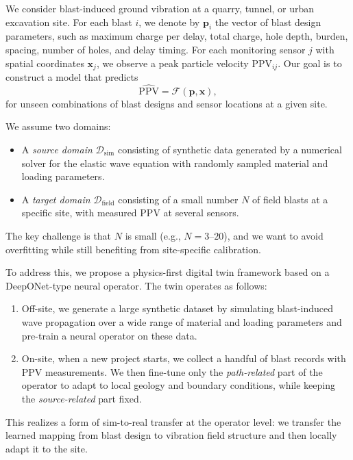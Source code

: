 \documentclass[a4paper,fleqn]{cas-sc}
\begin{document}
We consider blast-induced ground vibration at a quarry, tunnel, or urban excavation site.
For each blast $i$, we denote by $\mathbf{p}_i$ the vector of blast design parameters,
such as maximum charge per delay, total charge, hole depth,
burden, spacing, number of holes, and delay timing.
For each monitoring sensor $j$ with spatial coordinates $\mathbf{x}_j$,
we observe a peak particle velocity $\mathrm{PPV}_{ij}$.
Our goal is to construct a model that predicts
\begin{equation}
    \hat{\mathrm{PPV}} = \mathcal{F}(\mathbf{p}, \mathbf{x}),
\end{equation}
for unseen combinations of blast designs and sensor locations at a given site.

We assume two domains:
\begin{itemize}
  \item A \emph{source domain} $\mathcal{D}_\mathrm{sim}$ consisting of synthetic data generated by a numerical solver
        for the elastic wave equation with randomly sampled material and loading parameters.
  \item A \emph{target domain} $\mathcal{D}_\mathrm{field}$ consisting of a small number $N$ of field blasts at a specific site,
        with measured PPV at several sensors.
\end{itemize}
The key challenge is that $N$ is small (e.g., $N = 3$--$20$),
and we want to avoid overfitting while still benefiting from site-specific calibration.

To address this, we propose a physics-first digital twin framework
based on a DeepONet-type neural operator.
The twin operates as follows:
\begin{enumerate}
  \item Off-site, we generate a large synthetic dataset by simulating blast-induced wave propagation
        over a wide range of material and loading parameters
        and pre-train a neural operator on these data.
  \item On-site, when a new project starts,
        we collect a handful of blast records with PPV measurements.
        We then fine-tune only the \emph{path-related} part of the operator
        to adapt to local geology and boundary conditions,
        while keeping the \emph{source-related} part fixed.
\end{enumerate}
This realizes a form of sim-to-real transfer at the operator level:
we transfer the learned mapping from blast design to vibration field structure
and then locally adapt it to the site.
\end{document}
